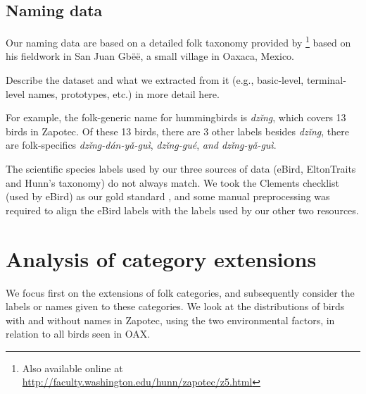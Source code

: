 \documentclass[10pt,letterpaper]{article}
\begin{document}
\subsection{Naming data}

Our naming data are based on a detailed folk taxonomy provided by \footnote{
Also available online at \url{http://faculty.washington.edu/hunn/zapotec/z5.html}} based on his fieldwork in San Juan Gb\"{e}\"{e}, a small village in Oaxaca, Mexico.

Describe the dataset and what we extracted from it (e.g., basic-level, terminal-level names, prototypes, etc.) in more detail here.

For example, the folk-generic name for hummingbirds is \textit{dz\v{i}n\b{g}}, which covers 13 birds in Zapotec. Of these 13 birds, there are 3 other labels besides \textit{dz\v{i}n\b{g}}, there are folk-specifics \textit{dz\v{i}n\b{g}-d\'{a}n-y\v{a}-gu\`{i}}, \textit{dz\v{i}n\b{g}-gu\'{e}}, \textit{and dz\v{i}n\b{g}-y\v{a}-gu\`{i}}.





The scientific species labels used by our three sources of data (eBird, EltonTraits and Hunn's taxonomy) do not always match. We took the Clements checklist (used by eBird) as our gold standard \cite{clements2007clements}, and some manual preprocessing was required to align the eBird labels with the labels used by our other two resources. 


\section{Analysis of category extensions}

We focus first on the extensions of folk categories, and subsequently consider the labels or names given to these categories. We look at the distributions of birds with and without names in Zapotec, using the two environmental factors, in relation to all birds seen in OAX.
\end{document}
